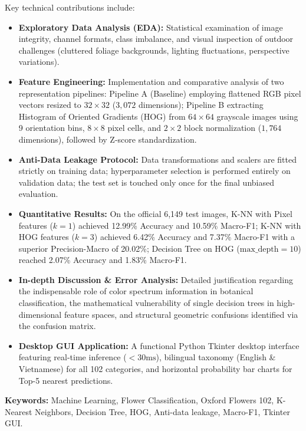 \documentclass[../DoAn.tex]{subfiles}
\begin{document}
Key technical contributions include:
\begin{itemize}
    \item \textbf{Exploratory Data Analysis (EDA):} Statistical examination of image integrity, channel formats, class imbalance, and visual inspection of outdoor challenges (cluttered foliage backgrounds, lighting fluctuations, perspective variations).
    \item \textbf{Feature Engineering:} Implementation and comparative analysis of two representation pipelines: Pipeline A (Baseline) employing flattened RGB pixel vectors resized to $32\times32$ ($3,072$ dimensions); Pipeline B extracting Histogram of Oriented Gradients (HOG) from $64\times64$ grayscale images using 9 orientation bins, $8\times8$ pixel cells, and $2\times2$ block normalization ($1,764$ dimensions), followed by Z-score standardization.
    \item \textbf{Anti-Data Leakage Protocol:} Data transformations and scalers are fitted strictly on training data; hyperparameter selection is performed entirely on validation data; the test set is touched only once for the final unbiased evaluation.
    \item \textbf{Quantitative Results:} On the official 6,149 test images, K-NN with Pixel features ($k=1$) achieved 12.99\% Accuracy and 10.59\% Macro-F1; K-NN with HOG features ($k=3$) achieved 6.42\% Accuracy and 7.37\% Macro-F1 with a superior Precision-Macro of 20.02\%; Decision Tree on HOG ($\text{max\_depth}=10$) reached 2.07\% Accuracy and 1.83\% Macro-F1.
    \item \textbf{In-depth Discussion \& Error Analysis:} Detailed justification regarding the indispensable role of color spectrum information in botanical classification, the mathematical vulnerability of single decision trees in high-dimensional feature spaces, and structural geometric confusions identified via the confusion matrix.
    \item \textbf{Desktop GUI Application:} A functional Python Tkinter desktop interface featuring real-time inference ($<30\text{ms}$), bilingual taxonomy (English \& Vietnamese) for all 102 categories, and horizontal probability bar charts for Top-5 nearest predictions.
\end{itemize}

\textbf{Keywords:} Machine Learning, Flower Classification, Oxford Flowers 102, K-Nearest Neighbors, Decision Tree, HOG, Anti-data leakage, Macro-F1, Tkinter GUI.
\end{document}
